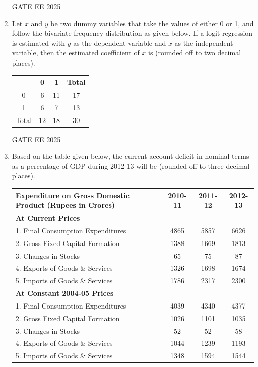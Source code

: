 \documentclass[journal,12pt,onecolumn]{IEEEtran}
\theoremstyle{remark}
\begin{document}
\begin{enumerate}
GATE EE 2025\\
\item Let $x$ and $y$ be two dummy variables that take the values of either 0 or 1, and follow the bivariate frequency distribution as given below. If a logit regression is estimated with $y$ as the dependent variable and $x$ as the independent variable, then the estimated coefficient of $x$ is \underline{\hspace{2cm}} (rounded off to two decimal places).

\begin{center}
\begin{tabular}{|c|c|c|c|}
\hline
 & 0 & 1 & Total \\
\hline
0 & 6 & 11 & 17 \\
1 & 6 & 7 & 13 \\
\hline
Total & 12 & 18 & 30 \\
\hline
\end{tabular}
\end{center}
GATE EE 2025\\
\item Based on the table given below, the current account deficit in nominal terms as a percentage of GDP during 2012-13 will be \underline{\hspace{2cm}} (rounded off to three decimal places).

\begin{center}
\begin{tabular}{|l|c|c|c|}
\hline
Expenditure on Gross Domestic Product (Rupees in Crores) & 2010-11 & 2011-12 & 2012-13 \\
\hline
\textbf{At Current Prices} & & & \\
1. Final Consumption Expenditures & 4865 & 5857 & 6626 \\
2. Gross Fixed Capital Formation & 1388 & 1669 & 1813 \\
3. Changes in Stocks & 65 & 75 & 87 \\
4. Exports of Goods \& Services & 1326 & 1698 & 1674 \\
5. Imports of Goods \& Services & 1786 & 2317 & 2300 \\
\hline
\textbf{At Constant 2004-05 Prices} & & & \\
1. Final Consumption Expenditures & 4039 & 4340 & 4377 \\
2. Gross Fixed Capital Formation & 1026 & 1101 & 1035 \\
3. Changes in Stocks & 52 & 52 & 58 \\
4. Exports of Goods \& Services & 1044 & 1239 & 1193 \\
5. Imports of Goods \& Services & 1348 & 1594 & 1544 \\


\end{tabular}
\end{center}
\end{enumerate}
\end{document}
